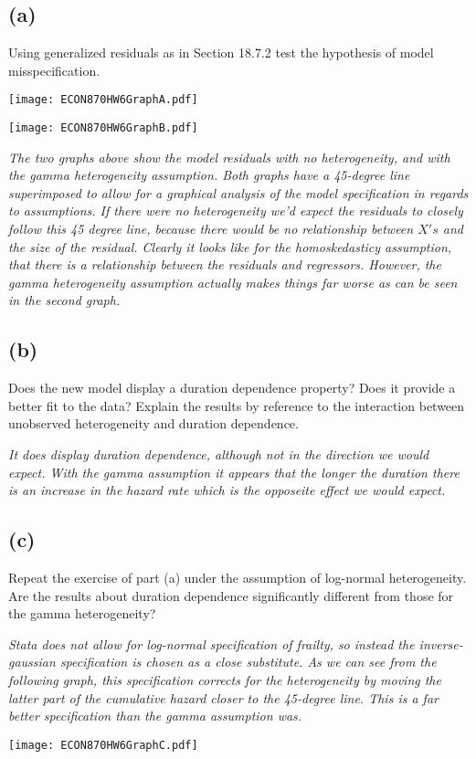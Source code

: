 \documentclass[11pt]{article}
\theoremstyle{definition}
\begin{document}
\subsection*{(a)} 
Using generalized residuals as in Section 18.7.2 test the hypothesis of model misspecification.  

\begin{center}
\texttt{[image: ECON870HW6GraphA.pdf]}
\end{center}

\begin{center}
\texttt{[image: ECON870HW6GraphB.pdf]}
\end{center}

\textit{The two graphs above show the model residuals with no heterogeneity, and with the gamma heterogeneity assumption.  Both graphs have a 45-degree line superimposed to allow for a graphical analysis of the model specification in regards to assumptions.  If there were no heterogeneity we'd expect the residuals to closely follow this 45 degree line, because there would be no relationship between $X's$ and the size of the residual.  Clearly it looks like for the homoskedasticy assumption, that there is a relationship between the residuals and regressors.  However, the gamma heterogeneity assumption actually makes things far worse as can be seen in the second graph.}   

\subsection*{(b)}
Does the new model display a duration dependence property?  Does it provide a better fit to the data? Explain the results by reference to the interaction between unobserved heterogeneity and duration dependence.  

\textit{It does display duration dependence, although not in the direction we would expect.  With the gamma assumption it appears that the longer the duration there is an increase in the hazard rate which is the opposeite effect we would expect.} 

\subsection*{(c)}
Repeat the exercise of part (a) under the assumption of log-normal heterogeneity.  Are the results about duration dependence significantly different from those for the gamma heterogeneity?

\textit{Stata does not allow for log-normal specification of frailty, so instead the inverse-gaussian specification is chosen as a close substitute.  As we can see from the following graph, this specification corrects for the heterogeneity by moving the latter part of the cumulative hazard closer to the 45-degree line.  This is a far better specification than the gamma assumption was.} 

\begin{center}
\texttt{[image: ECON870HW6GraphC.pdf]}
\end{center}

\begin{center}

\end{center}

\begin{center}

\end{center}
\end{document}
